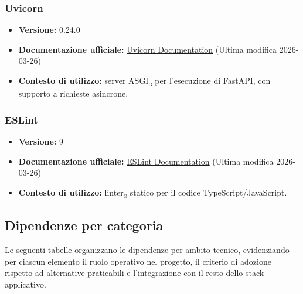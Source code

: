 \documentclass[a4paper, 11pt, oneside]{scrartcl}
\begin{document}
\subsubsection{Uvicorn}
\begin{itemize}[noitemsep]
    \item \textbf{Versione:} 0.24.0
    \item \textbf{Documentazione ufficiale:} \href{https://www.uvicorn.org/}{Uvicorn Documentation} (Ultima modifica 2026-03-26)
    \item \textbf{Contesto di utilizzo:} server ASGI\textsubscript{\textsc{g}} per l'esecuzione di FastAPI, con supporto a richieste asincrone.
\end{itemize}

\subsubsection{ESLint}
\begin{itemize}[noitemsep]
    \item \textbf{Versione:} 9
    \item \textbf{Documentazione ufficiale:} \href{https://eslint.org/docs/latest/}{ESLint Documentation} (Ultima modifica 2026-03-26)
    \item \textbf{Contesto di utilizzo:} linter\textsubscript{\textsc{g}} statico per il codice TypeScript/JavaScript.
\end{itemize}
\newpage

\subsection{Dipendenze per categoria}
Le seguenti tabelle organizzano le dipendenze per ambito tecnico, evidenziando per ciascun elemento il ruolo operativo nel progetto, il criterio di adozione rispetto ad alternative praticabili e l'integrazione con il resto dello stack applicativo.
\end{document}
